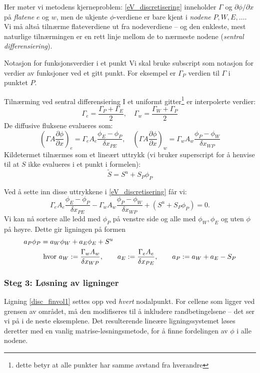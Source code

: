 Her møter vi metodens kjerneproblem: \eqref{eV_discretisering} inneholder $\Gamma$ og $\partial\phi/\partial x$ på \emph{flatene} $e$ og $w$, men de ukjente $\phi$-verdiene er bare kjent i \emph{nodene} $P,W,E,\ldots$. Vi må altså tilnærme flateverdiene ut fra nodeverdiene -- og den enkleste, mest naturlige tilnærmingen er en rett linje mellom de to nærmeste nodene (\emph{sentral differensiering}).

\begin{defn}{Notasjon for funksjonsverdier i et punkt}
Vi skal bruke subscript som notasjon for  verdier av funksjoner ved et gitt punkt. For eksempel er $\Gamma_P$ verdien til $\Gamma$ i punktet $P$.
\end{defn}

\begin{oppsum}{Tilnærming ved sentral differensiering}
 I et uniformt gitter\footnote{dette betyr at alle punkter har samme avstand fra hverandre} er interpolerte verdier:
\[
\Gamma_e = \frac{\Gamma_P + \Gamma_E}{2}, \quad \Gamma_w = \frac{\Gamma_W + \Gamma_P}{2}
\]
De diffusive fluksene evalueres som:
\[
\left( \Gamma A \frac{\partial\phi}{\partial x} \right)_e = \Gamma_e A_e \frac{\phi_E - \phi_P}{\delta x_{PE}}, \quad
\left( \Gamma A \frac{\partial\phi}{\partial x} \right)_w = \Gamma_w A_w \frac{\phi_P - \phi_W}{\delta x_{WP}}
\]
Kildetermet tilnærmes som et lineært uttrykk (vi bruker superscript for å henvise til at $S$ ikke evalueres i et punkt i formelen):
\[
\tilde{S} = S^u + S_P \phi_P
\]
\end{oppsum}
Ved å sette inn disse uttrykkene i \eqref{eV_discretisering} får vi:
\[\Gamma_eA_e\frac{\phi_E-\phi_P}{\delta x_{PE}}- \Gamma_wA_w\frac{\phi_P-\phi_W}{\delta x_{WP}}+(S^u+S_P\phi_P)=0.\]
Vi kan nå sortere alle ledd med $\phi_P$ på venstre side og alle med $\phi_W,\phi_E$ og uten $\phi$ på høyre. Dette gir ligningen på formen
\begin{align} \label{disc_finvol1}
a_P \phi_P &= a_W \phi_W + a_E \phi_E + S^u  \\
&\text{ hvor } a_W := \frac{\Gamma_w A_w}{\delta x_{WP}}, \qquad a_E := \frac{\Gamma_e A_e}{\delta x_{PE}}, \qquad
a_P := a_W + a_E - S_P \notag
\end{align}

\subsubsection*{Steg 3: Løsning av ligninger}

Ligning \eqref{disc_finvol1} settes opp ved \emph{hvert} nodalpunkt. For cellene som ligger ved grensen av området, må den modifiseres til å inkludere randbetingelsene -- det ser vi på i de neste eksemplene. Det resulterende lineære ligningssystemet løses deretter med en vanlig matrise-løsningsmetode, for å finne fordelingen av $\phi$ i alle nodene.

